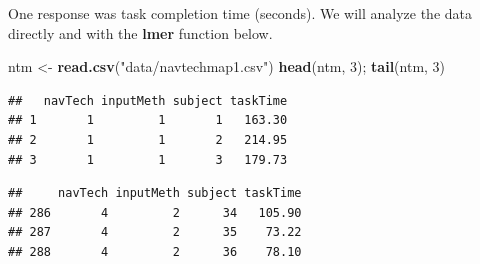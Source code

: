 \documentclass[
]{book}
\newenvironment{Shaded}{\begin{snugshade}}{\end{snugshade}}
\newcommand{\DecValTok}[1]{\textcolor[rgb]{0.00,0.00,0.81}{#1}}
\newcommand{\FunctionTok}[1]{\textcolor[rgb]{0.13,0.29,0.53}{\textbf{#1}}}
\newcommand{\NormalTok}[1]{#1}
\newcommand{\OtherTok}[1]{\textcolor[rgb]{0.56,0.35,0.01}{#1}}
\newcommand{\StringTok}[1]{\textcolor[rgb]{0.31,0.60,0.02}{#1}}
\begin{document}
One response was task completion time (seconds). We will analyze the
data directly and with the \textbf{lmer} function below.

\begin{Shaded}
\begin{Highlighting}[]
\NormalTok{ntm }\OtherTok{\textless{}{-}} \FunctionTok{read.csv}\NormalTok{(}\StringTok{"data/navtechmap1.csv"}\NormalTok{)}
\FunctionTok{head}\NormalTok{(ntm, }\DecValTok{3}\NormalTok{); }\FunctionTok{tail}\NormalTok{(ntm, }\DecValTok{3}\NormalTok{)}
\end{Highlighting}
\end{Shaded}

\begin{verbatim}
##   navTech inputMeth subject taskTime
## 1       1         1       1   163.30
## 2       1         1       2   214.95
## 3       1         1       3   179.73
\end{verbatim}

\begin{verbatim}
##     navTech inputMeth subject taskTime
## 286       4         2      34   105.90
## 287       4         2      35    73.22
## 288       4         2      36    78.10
\end{verbatim}
\end{document}
